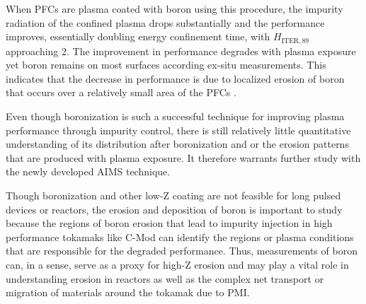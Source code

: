 \documentclass[final,3p,times,twocolumn]{elsarticle}
\begin{document}
When PFCs are plasma coated with boron using this procedure, the impurity radiation of the confined plasma drops substantially and the performance improves, essentially doubling energy confinement time, with $H_\mathrm{ITER,89}$ approaching 2.  The improvement in performance degrades with plasma exposure yet boron remains on most surfaces according ex-situ measurements.  This indicates that the decrease in performance is due to localized erosion of boron that occurs over a relatively small area of the PFCs \cite{WWoBoronization}.

Even though boronization is such a successful technique for improving plasma performance through impurity control, there is still relatively little quantitative understanding of its distribution after boronization and or the erosion patterns that are produced with plasma exposure.  It therefore warrants further study with the newly developed AIMS technique.  

Though boronization and other low-Z coating are not feasible for long pulsed devices or reactors, the erosion and deposition of boron is important to study because the regions of boron erosion that lead to impurity injection in high performance tokamaks like C-Mod can identify the regions or plasma conditions that are responsible for the degraded performance.  Thus, measurements of boron can, in a sense, serve as a proxy for high-Z erosion and may play a vital role in understanding erosion in reactors as well as the complex net transport or migration of materials around the tokamak due to PMI.


\end{document}
